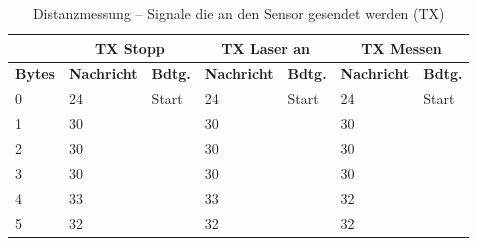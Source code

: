 \pagebreak[4]
\begin{table}[!ht]
	\centering
	\caption{Distanzmessung – Signale die an den Sensor gesendet werden (TX)}
	\label{Steuerung:tab:TX1}
	\begin{tabular}{lllllll}
		\hline
		                        & \multicolumn{2}{c}{TX Stopp} & \multicolumn{2}{c}{ TX Laser an}                   & \multicolumn{2}{c}{TX Messen}                                                                                                                   \\ \hline
		\textbf{Bytes}          & \textbf{Nachricht}           & \textbf{Bdtg.}                                     & \textbf{Nachricht}            & \textbf{Bdtg.}                                     & \textbf{Nachricht}         & \textbf{Bdtg.}                \\ \hline
		\multicolumn{1}{l|}{0}  & \cellcolor[HTML]{9AFF99}24   & \multicolumn{1}{l|}{\cellcolor[HTML]{9AFF99}Start} & \cellcolor[HTML]{9AFF99}24    & \multicolumn{1}{l|}{\cellcolor[HTML]{9AFF99}Start} & \cellcolor[HTML]{9AFF99}24 & \cellcolor[HTML]{9AFF99}Start \\
		\multicolumn{1}{l|}{1}  & \cellcolor[HTML]{FCFF2F}30   & \multicolumn{1}{l|}{\cellcolor[HTML]{FCFF2F}}      & \cellcolor[HTML]{FCFF2F}30    & \multicolumn{1}{l|}{\cellcolor[HTML]{FCFF2F}}      & \cellcolor[HTML]{FCFF2F}30 & \cellcolor[HTML]{FCFF2F}      \\
		\multicolumn{1}{l|}{2}  & \cellcolor[HTML]{FCFF2F}30   & \multicolumn{1}{l|}{\cellcolor[HTML]{FCFF2F}}      & \cellcolor[HTML]{FCFF2F}30    & \multicolumn{1}{l|}{\cellcolor[HTML]{FCFF2F}}      & \cellcolor[HTML]{FCFF2F}30 & \cellcolor[HTML]{FCFF2F}      \\
		\multicolumn{1}{l|}{3}  & \cellcolor[HTML]{FCFF2F}30   & \multicolumn{1}{l|}{\cellcolor[HTML]{FCFF2F}}      & \cellcolor[HTML]{FCFF2F}30    & \multicolumn{1}{l|}{\cellcolor[HTML]{FCFF2F}}      & \cellcolor[HTML]{FCFF2F}30 & \cellcolor[HTML]{FCFF2F}      \\
		\multicolumn{1}{l|}{4}  & 33                           & \multicolumn{1}{l|}{}                              & 33                            & \multicolumn{1}{l|}{}                              & 32                         &                               \\
		\multicolumn{1}{l|}{5}  & 32                           & \multicolumn{1}{l|}{}                              & 32                            & \multicolumn{1}{l|}{}                              & 32                         &                               \\

\end{tabular}
\end{table}
